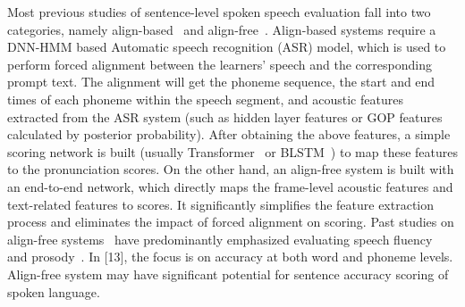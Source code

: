 Most previous studies of sentence-level spoken speech evaluation fall into two categories, namely align-based~\cite{multipa,gopt,3m,our1,our2,wong22_interspeech,hipama} and align-free~\cite{liuwei,ssl1,liang23_interspeech}. Align-based systems require a DNN-HMM based Automatic speech recognition (ASR) model, which is used to perform forced alignment between the learners' speech and the corresponding prompt text. The alignment will get the phoneme sequence, the start and end times of each phoneme within the speech segment, and acoustic features extracted from the ASR system (such as hidden layer features or GOP features~\cite{gop} calculated by posterior probability). After obtaining the above features, a simple scoring network is built (usually Transformer~\cite{gopt,3m,hipama} or BLSTM~\cite{our1,our2,wong22_interspeech}) to map these features to the pronunciation scores. On the other hand, an align-free system is built with an end-to-end network, which directly maps the frame-level acoustic features and text-related features to scores. It significantly simplifies the feature extraction process and eliminates the impact of forced alignment on scoring. Past studies on align-free systems~\cite{liuwei,ssl1} have predominantly emphasized evaluating speech fluency~\cite{liuwei,ssl1} and prosody~\cite{ssl1}. In [13], the focus is on accuracy at both word and phoneme levels. Align-free system may have significant potential for sentence accuracy scoring of spoken language.

